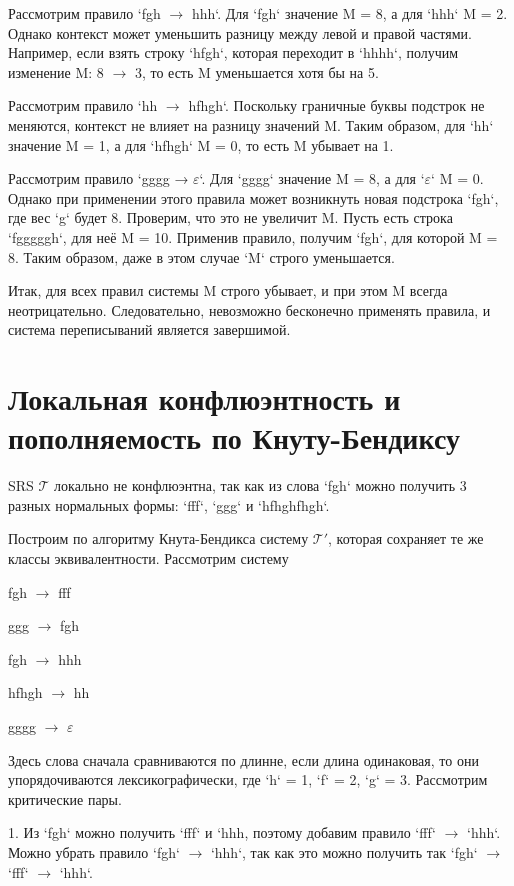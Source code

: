 \documentclass[a4paper, 14pt]{extarticle}
\begin{document}
Рассмотрим правило `fgh $\rightarrow$ hhh`. Для `fgh` значение M = 8, а для `hhh` M = 2. Однако контекст может уменьшить разницу между левой и правой частями. Например, если взять строку `hfgh`, которая переходит в `hhhh`, получим изменение M: 8 $\rightarrow$ 3, то есть M уменьшается хотя бы на 5.

Рассмотрим правило `hh $\rightarrow$ hfhgh`. Поскольку граничные буквы подстрок не меняются, контекст не влияет на разницу значений M. Таким образом, для `hh` значение M = 1, а для `hfhgh` M = 0, то есть M убывает на 1.

Рассмотрим правило `gggg → $\varepsilon$`. Для `gggg` значение M = 8, а для `$\varepsilon$` M = 0. Однако при применении этого правила может возникнуть новая подстрока `fgh`, где вес `g` будет 8. Проверим, что это не увеличит M. Пусть есть строка `fgggggh`, для неё M = 10. Применив правило, получим `fgh`, для которой M = 8. Таким образом, даже в этом случае `M` строго уменьшается.

Итак, для всех правил системы M строго убывает, и при этом M всегда неотрицательно. Следовательно, невозможно бесконечно применять правила, и система переписываний является завершимой.

\section{Локальная конфлюэнтность и пополняемость по Кнуту-Бендиксу}
SRS $\mathcal{T}$ локально не конфлюэнтна, так как из слова `fgh` можно получить 3 разных нормальных формы: `fff`, `ggg` и `hfhghfhgh`. 

Построим по алгоритму Кнута-Бендикса систему $\mathcal{T}'$, которая сохраняет те же классы эквивалентности. Рассмотрим систему 

fgh $\rightarrow$ fff

ggg $\rightarrow$ fgh

fgh $\rightarrow$ hhh

hfhgh $\rightarrow$ hh

gggg $\rightarrow$ $\varepsilon$

Здесь слова сначала сравниваются по длинне, если длина одинаковая, то они упорядочиваются лексикографически, где `h` = 1, `f` = 2, `g` = 3. Рассмотрим критические пары.

1. Из `fgh` можно получить `fff` и `hhh, поэтому добавим правило `fff` $\rightarrow$ `hhh`. Можно убрать правило `fgh` $\rightarrow$ `hhh`, так как это можно получить так `fgh` $\rightarrow$ `fff` $\rightarrow$ `hhh`.
\end{document}

